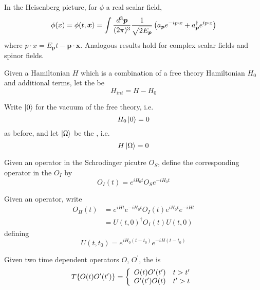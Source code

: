 \documentclass{article}
\begin{document}
\begin{theorem}
In the Heisenberg picture, for $\phi$ a real scalar field, 
\[
\phi(x)=\phi(t,\bm{x}) = \int\frac{d^3\bm{p}}{(2\pi)^3}  \frac{1}{\sqrt{2E_{\bm{p}}}} \left( a_{\bm{p}} e^{-i p\cdot x} + a_{\bm{p}}^\dagger e^{i p\cdot x} \right)
\]
where $p\cdot x = E_{\bm{p}}t-\bm{p}\cdot\bm{x}$. Analogous results hold for complex scalar fields and spinor fields. 
\end{theorem} 

\begin{definition}
Given a Hamiltonian $H$ which is a combination of a free theory Hamiltonian $H_0$ and additional terms, let the  be 
\[
H_{int} = H - H_0
\]
\end{definition}

\begin{definition}
Write $\ket{0}$ for the vacuum of the free theory, i.e. 
\[
H_0 \ket{0} = 0
\]
as before, and let $\ket{\Omega}$ be the , i.e. \[
H \ket{\Omega} = 0
\]
\end{definition}

\begin{definition}
Given an operator in the Schrodinger picutre $O_S$, define the corresponding operator in the  $O_I$ by 
\[
O_I(t) = e^{iH_0t} O_S e^{-iH_0t}
\]
\end{definition}

\begin{definition}[$U(t,t_0)$]
Given an operator, write 
\begin{align*}
O_H(t) &= e^{iHt} e^{-iH_0t} O_I(t) e^{iH_0t}e^{-iHt} \\
 &= U(t,0)^\dagger O_I(t) U(t,0)
\end{align*}
defining 
\[
U(t,t_0) = e^{iH_0 (t-t_0)}e^{-iH (t-t_0)}
\]
\end{definition}

\begin{definition}
Given two time dependent operators $O$, $O^\prime$, the  is 
\[
T \{ O(t) O^\prime(t^\prime) \} = \left\{ \begin{array}{lc} O(t) O^\prime(t^\prime) & t > t^\prime \\
    O^\prime(t^\prime) O(t) & t^\prime > t 
    \end{array} \right. \\
\]
\end{definition}
\end{document}
